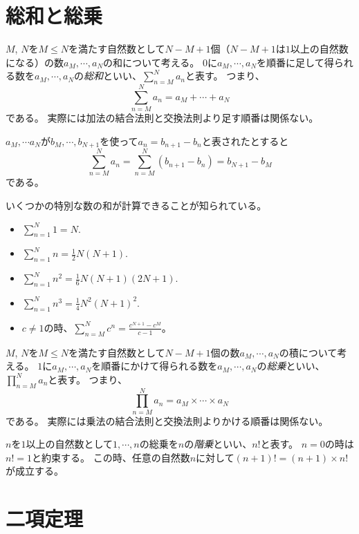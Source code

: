 \section{総和と総乗}

$M$, $N$を$M \le N$を満たす自然数として$N-M+1$個（$N-M+1$は$1$以上の自然数になる）の数$a_M, \cdots, a_N$の和について考える。
$0$に$a_M, \cdots, a_N$を順番に足して得られる数を$a_M, \cdots, a_N$の\emph{総和}といい、$\sum_{n = M}^N a_n$と表す。
つまり、
$$
\sum_{n = M}^N a_n = a_M+\cdots+a_N
$$
である。
実際には加法の結合法則と交換法則より足す順番は関係ない。

\begin{proposition}
$a_M, \cdots a_N$が$b_M, \cdots, b_{N+1}$を使って$a_n = b_{n+1}-b_n$と表されたとすると
$$
\sum_{n = M}^N a_n = \sum_{n = M}^N(b_{n+1}-b_n) = b_{N+1}-b_M
$$
である。
\end{proposition}

いくつかの特別な数の和が計算できることが知られている。

\begin{proposition}[和の公式]
\begin{itemize}
\item
$\sum_{n = 1}^N 1 = N$.
\item
$\sum_{n = 1}^N n = \frac{1}{2}N(N+1)$.
\item
$\sum_{n = 1}^N n^2 = \frac{1}{6}N(N+1)(2 N+1)$.
\item
$\sum_{n = 1}^N n^3 = \frac{1}{4}N^2(N+1)^2$.
\item
$c \ne 1$の時、$\sum_{n = M}^N c^n = \frac{c^{N+1}-c^M}{c-1}$。
\end{itemize}
\end{proposition}

$M$, $N$を$M \le N$を満たす自然数として$N-M+1$個の数$a_M, \cdots, a_N$の積について考える。
$1$に$a_M, \cdots, a_N$を順番にかけて得られる数を$a_M, \cdots, a_N$の\emph{総乗}といい、$\prod_{n = M}^N a_n$と表す。
つまり、
$$
\prod_{n = M}^N a_n = a_M\times\cdots\times a_N
$$
である。
実際には乗法の結合法則と交換法則よりかける順番は関係ない。

$n$を$1$以上の自然数として$1, \cdots, n$の総乗を$n$の\emph{階乗}といい、$n!$と表す。
$n = 0$の時は$n! = 1$と約束する。
この時、任意の自然数$n$に対して$(n+1)! = (n+1)\times n!$が成立する。

\section{二項定理}

